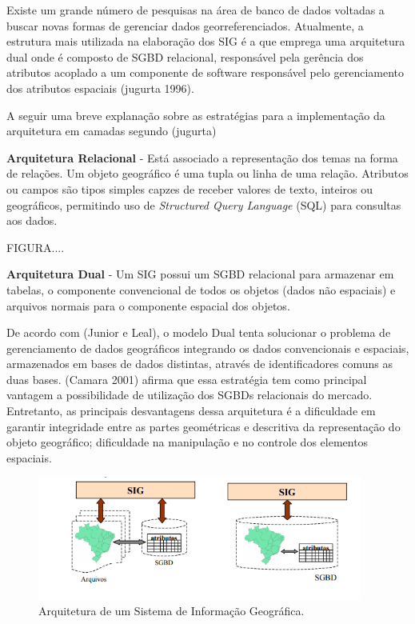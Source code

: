 \documentclass[
	12pt,				%
    oneside,			%
	a4paper,			%
	english,			%
	french,				%
	spanish,			%
	brazil,				%
	]{abntex2}
\begin{document}
Existe um grande número de pesquisas na área de banco de dados voltadas a buscar novas formas de gerenciar dados georreferenciados. Atualmente, a estrutura mais utilizada na elaboração dos SIG é a que emprega uma arquitetura dual onde é composto de SGBD relacional, responsável pela gerência dos atributos acoplado a um componente de software responsável pelo gerenciamento dos atributos espaciais (jugurta 1996). 

A seguir uma breve explanação sobre as estratégias para a implementação da arquitetura em camadas segundo (jugurta)

\textbf{Arquitetura Relacional} - Está associado a representação dos temas na forma de relações. Um objeto geográfico é uma tupla ou linha de uma relação. Atributos ou campos são tipos simples capzes de receber valores de texto, inteiros ou geográficos, permitindo uso de \textit{Structured Query Language} (SQL) para consultas aos dados.

FIGURA....

\textbf{Arquitetura Dual} - Um SIG possui um SGBD relacional para armazenar em tabelas, o componente convencional de todos os objetos (dados não espaciais) e arquivos normais para o componente espacial dos objetos. 

De acordo com (Junior e Leal), o modelo Dual tenta solucionar o problema de gerenciamento de dados geográficos integrando os dados convencionais e espaciais, armazenados em bases de dados distintas, através de identificadores comuns as duas bases. (Camara 2001) afirma que essa estratégia tem como principal vantagem a possibilidade de utilização dos SGBDs relacionais do mercado. Entretanto, as principais desvantagens dessa arquitetura é a dificuldade em garantir integridade entre as partes geométricas e descritiva da representação do objeto geográfico; dificuldade na manipulação e no controle dos elementos espaciais.

\begin{figure} [H] 
\label{figura1} 
\caption{Arquitetura de um Sistema de Informação Geográfica.}
\includegraphics[width=0.95\textwidth]{dual_integrada.png} %
\end{figure}
\end{document}
